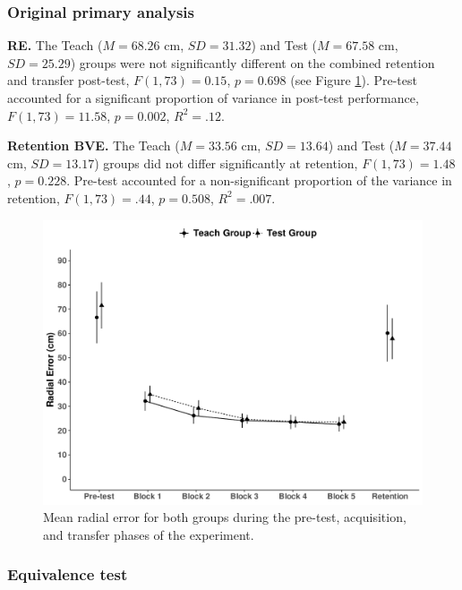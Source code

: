 \documentclass[
  english,
  man,floatsintext]{apa7}
\begin{document}
\hypertarget{original-primary-analysis}{%
\subsubsection{Original primary analysis}\label{original-primary-analysis}}

\textbf{RE.} The Teach (\(M = 68.26\) cm, \(SD = 31.32\)) and Test (\(M = 67.58\) cm, \(SD = 25.29\)) groups were not significantly different on the combined retention and transfer post-test, \(F(1,73) = 0.15\), \(p = 0.698\) (see Figure \ref{fig:fig1}). Pre-test accounted for a significant proportion of variance in post-test performance, \(F(1,73) = 11.58\), \(p = 0.002\), \(R^{2} = .12\).

\textbf{Retention BVE.} The Teach (\(M = 33.56\) cm, \(SD = 13.64\)) and Test (\(M = 37.44\) cm, \(SD = 13.17\)) groups did not differ significantly at retention, \(F(1,73) = 1.48\), \(p = 0.228\). Pre-test accounted for a non-significant proportion of the variance in retention, \(F(1, 73) = .44\), \(p = 0.508\), \(R^{2} = .007\).

\begin{figure}

{\centering \includegraphics[width=1\linewidth,height=1\textheight]{../../figs/fig1} 

}

\caption{Mean radial error for both groups during the pre-test, acquisition, and transfer phases of the experiment.}\label{fig:fig1}
\end{figure}

\hypertarget{equivalence-test}{%
\subsubsection{Equivalence test}\label{equivalence-test}}
\end{document}

